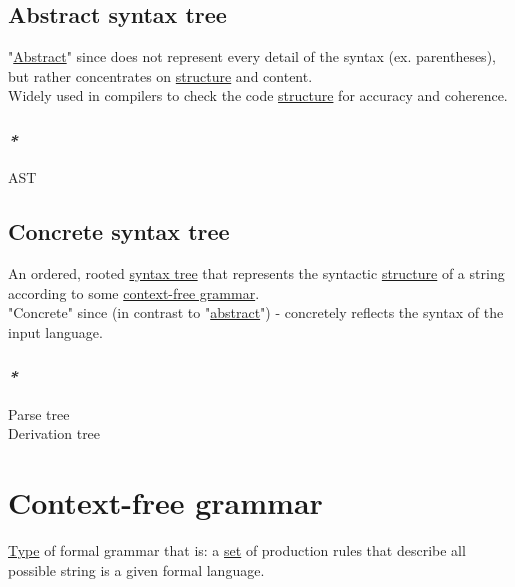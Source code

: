 \documentclass[a4paper,14pt,oneside]{book}
\begin{document}
\section{\label{org8568da7}Abstract syntax tree}
\label{sec:org6a01ced}
"\hyperref[org321fc4b]{Abstract}" since does not represent every detail of the syntax (ex. parentheses), but rather concentrates on \hyperref[orgc940043]{structure} and content.\\

Widely used in compilers to check the code \hyperref[orgc940043]{structure} for accuracy and coherence.\\

\subsection{\emph{*}}
\label{sec:org1296e40}

\label{org6a8b44a}AST\\

\section{\label{org84aa032}Concrete syntax tree}
\label{sec:orgee548ef}

An ordered, rooted \hyperref[org1e5eb45]{syntax tree} that represents the syntactic \hyperref[orgc940043]{structure} of a string according to some \hyperref[org04b623e]{context-free grammar}.\\

"Concrete" since (in contrast to "\hyperref[org321fc4b]{abstract}") - concretely reflects the syntax of the input language.\\

\subsection{\emph{*}}
\label{sec:org83bbbfe}

\label{org6613693}Parse tree\\
\label{orgafbf80a}Derivation tree\\

\chapter{\label{org04b623e}Context-free grammar}
\label{sec:org5f42725}
\hyperref[orgd6db20c]{Type} of formal grammar that is: a \hyperref[orge119629]{set} of production rules that describe all possible string is a given formal language.\\
\end{document}
